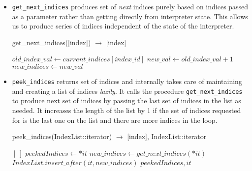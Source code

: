 \begin{itemize}
\item \texttt{get\_next\_indices} produces set of \textit{next} indices purely
  based on indices passed as a parameter rather than getting directly from interpreter
  state. This allows us to produce series of indices independent of the state of
  the interpreter.
  \begin{algorithm}  {get\_next\_indices([index]) $\rightarrow$ [index]}
    \singlespacing

    \begin{algorithmic}[1]
      \State $old\_index\_val \gets current\_indices[index\_id]$
      \State $new\_val \gets old\_index\_val + 1$
      \State $new\_indices \gets new\_val$
      \EndFor%
      \State {}
      \EndFunction
    \end{algorithmic}
  \end{algorithm}

\item \texttt{peek\_indices} returns set of indices and internally takes care of
  maintaining and creating a list of indices \textit{lazily}. It calls the procedure
  \texttt{get\_next\_indices} to produce next set of indices by passing the last
  set of indices in the list as needed. It increases the length of the list by 1 if
  the set of indices requested for is the last one on the list and there are more indices
  in the loop.

  \begin{algorithm}  {peek\_indices(IndexList::iterator) $\rightarrow$ [index], IndexList::iterator}
    \singlespacing

    \begin{algorithmic}[1]
      \State \Return $[\ ]$
      \Else
      \State $peekedIndices \gets *it$
      \State $new\_indices \gets get\_next\_indices(*it)$
      \State $IndexList.insert\_after(it, new\_indices)$
      \EndIf
      \State \Return $peekedIndices, it$
      \EndIf
      \EndFunction
    \end{algorithmic}
  \end{algorithm}


\end{itemize}
